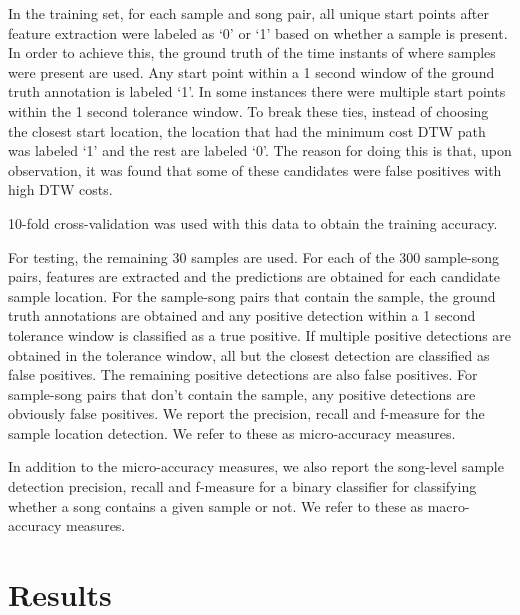 \documentclass{article}
\begin{document}
In the training set, for each sample and song pair, all unique start points after feature extraction were labeled as `0' or `1' based on whether a sample is present. In order to achieve this, the ground truth of the time instants of where samples were present are used. Any start point within a 1 second window of the ground truth annotation is labeled `1'. In some instances there were multiple start points within the 1 second tolerance window. To break these ties, instead of choosing the closest start location, the location that had the minimum cost DTW path was labeled `1' and the rest are labeled `0'. The reason for doing this is that, upon observation, it was found that some of these candidates were false positives with high DTW costs.

10-fold cross-validation was used with this data to obtain the training accuracy.

For testing, the remaining 30 samples are used. For each of the 300 sample-song pairs, features are extracted and the predictions are obtained for each candidate sample location. For the sample-song pairs that contain the sample, the ground truth annotations are obtained and any positive detection within a 1 second tolerance window is classified as a true positive. If multiple positive detections are obtained in the tolerance window, all but the closest detection are classified as false positives. The remaining positive detections are also false positives. For sample-song pairs that don't contain the sample, any positive detections are obviously false positives. We report the precision, recall and f-measure for the sample location detection. We refer to these as micro-accuracy measures.

In addition to the micro-accuracy measures, we also report the song-level sample detection precision, recall and f-measure for a binary classifier for classifying whether a song contains a given sample or not. We refer to these as macro-accuracy measures.

\section{Results}


\end{document}
